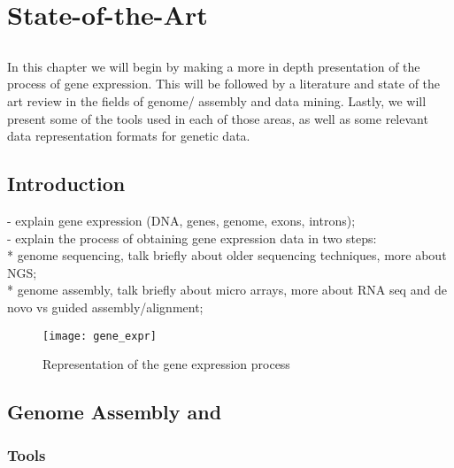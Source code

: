 \chapter{State-of-the-Art} \label{chap:sota}

\section*{}

In this chapter we will begin by making a more in depth presentation of the
process of gene expression. This will be followed by a literature and state of
the art review in the fields of genome/\trans{} assembly and data mining.
Lastly, we will present some of the tools used in each of those areas, as well
as some relevant data representation formats for genetic data.

\section{Introduction}

- explain gene expression (DNA, genes, genome, exons, introns);\\
- explain the process of obtaining gene expression data in two steps:\\
  * genome sequencing, talk briefly about older sequencing techniques, more
  about NGS;\\
  * genome assembly, talk briefly about micro arrays, more about RNA seq and de
  novo vs guided assembly/alignment;\\

\begin{figure}[!htb]
  \begin{center}
    \leavevmode
    \texttt{[image: gene\_expr]}
    \caption{Representation of the gene expression process\protect\footnotemark}
    \label{fig:arch}
  \end{center}
\end{figure}

\section{Genome Assembly and \rnaseq}\label{sec:assembly}

\subsection{\rnaseq{} Tools}\label{sec:seqtools}

